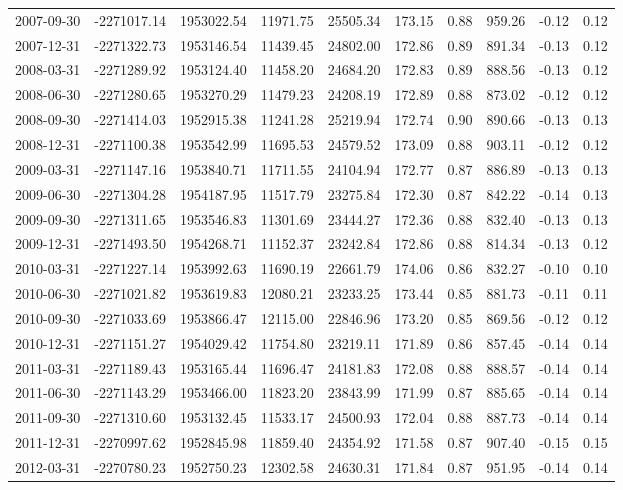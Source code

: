 \begin{landscape}
\begin{longtable}{llllllllll}
2007-09-30 & -2271017.14 & 1953022.54 & 11971.75 & 25505.34 & 173.15 & 0.88 & 959.26  & -0.12 & 0.12 \\
2007-12-31 & -2271322.73 & 1953146.54 & 11439.45 & 24802.00 & 172.86 & 0.89 & 891.34  & -0.13 & 0.12 \\
2008-03-31 & -2271289.92 & 1953124.40 & 11458.20 & 24684.20 & 172.83 & 0.89 & 888.56  & -0.13 & 0.12 \\
2008-06-30 & -2271280.65 & 1953270.29 & 11479.23 & 24208.19 & 172.89 & 0.88 & 873.02  & -0.12 & 0.12 \\
2008-09-30 & -2271414.03 & 1952915.38 & 11241.28 & 25219.94 & 172.74 & 0.90 & 890.66  & -0.13 & 0.13 \\
2008-12-31 & -2271100.38 & 1953542.99 & 11695.53 & 24579.52 & 173.09 & 0.88 & 903.11  & -0.12 & 0.12 \\
2009-03-31 & -2271147.16 & 1953840.71 & 11711.55 & 24104.94 & 172.77 & 0.87 & 886.89  & -0.13 & 0.13 \\
2009-06-30 & -2271304.28 & 1954187.95 & 11517.79 & 23275.84 & 172.30 & 0.87 & 842.22  & -0.14 & 0.13 \\
2009-09-30 & -2271311.65 & 1953546.83 & 11301.69 & 23444.27 & 172.36 & 0.88 & 832.40  & -0.13 & 0.13 \\
2009-12-31 & -2271493.50 & 1954268.71 & 11152.37 & 23242.84 & 172.86 & 0.88 & 814.34  & -0.13 & 0.12 \\
2010-03-31 & -2271227.14 & 1953992.63 & 11690.19 & 22661.79 & 174.06 & 0.86 & 832.27  & -0.10 & 0.10 \\
2010-06-30 & -2271021.82 & 1953619.83 & 12080.21 & 23233.25 & 173.44 & 0.85 & 881.73  & -0.11 & 0.11 \\
2010-09-30 & -2271033.69 & 1953866.47 & 12115.00 & 22846.96 & 173.20 & 0.85 & 869.56  & -0.12 & 0.12 \\
2010-12-31 & -2271151.27 & 1954029.42 & 11754.80 & 23219.11 & 171.89 & 0.86 & 857.45  & -0.14 & 0.14 \\
2011-03-31 & -2271189.43 & 1953165.44 & 11696.47 & 24181.83 & 172.08 & 0.88 & 888.57  & -0.14 & 0.14 \\
2011-06-30 & -2271143.29 & 1953466.00 & 11823.20 & 23843.99 & 171.99 & 0.87 & 885.65  & -0.14 & 0.14 \\
2011-09-30 & -2271310.60 & 1953132.45 & 11533.17 & 24500.93 & 172.04 & 0.88 & 887.73  & -0.14 & 0.14 \\
2011-12-31 & -2270997.62 & 1952845.98 & 11859.40 & 24354.92 & 171.58 & 0.87 & 907.40  & -0.15 & 0.15 \\
2012-03-31 & -2270780.23 & 1952750.23 & 12302.58 & 24630.31 & 171.84 & 0.87 & 951.95  & -0.14 & 0.14 \\

\end{longtable}
\end{landscape}
